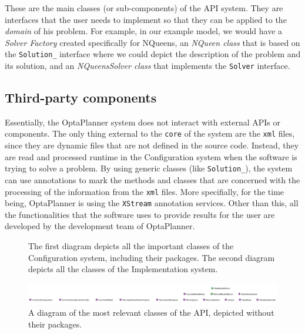 These are the main classes (or sub-components) of the API system. They are interfaces that the user needs to implement so that they can be applied to the \textit{domain} of his problem. For example, in our example model, we would have a \textit{Solver Factory} created specifically for NQueens, an \textit{NQueen class} that is based on the \verb!Solution_! interface where we could depict the description of the problem and its solution, and an \textit{NQueensSolver class} that implements the \verb!Solver! interface.
\subsection{Third-party components}
Essentially, the OptaPlanner system does not interact with external APIs or components. The only thing external to the \verb!core! of the system are the \verb!xml! files, since they are dynamic files that are not defined in the source code. Instead, they are read and processed runtime in the Configuration system when the software is trying to solve a problem. By using generic classes (like \verb!Solution_!), the system can use annotations to mark the methods and classes that are concerned with the processing of the information from the \verb!xml! files. More specifially, for the time being, OptaPlanner is using the \verb!XStream! annotation services. Other than this, all the functionalities that the software uses to provide results for the user are developed by the development team of OptaPlanner.
\begin{figure}
    \hfill
    \caption{The first diagram depicts all the important classes of the Configuration system, including their packages. The second diagram depicts all the classes of the Implementation system.}
    \label{fig:all-classes}
\end{figure}
\begin{figure}
    \centering
    \includegraphics[width=\textwidth]{figures/step2/api-all-classes1.png}
    \caption{A diagram of the most relevant classes of the API, depicted without their packages.}
    \label{fig:api-all-classes}
\end{figure}